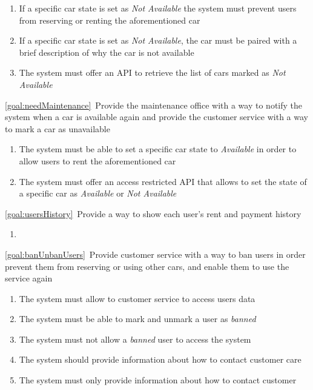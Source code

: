 \begin{description}
\begin{enumerate}[resume*]
   				\item If a specific car state is set as \emph{Not Available} the system must 
   				prevent users from reserving or renting the aforementioned car
   				\item If a specific car state is set as \emph{Not Available}, the car must be paired
   				with a brief description of why the car is not available
   				\item The system must offer an API to retrieve the list of cars marked as \emph{Not
   				Available}
  			\end{enumerate}
		\item \ref{goal:needMaintenance}\ Provide the maintenance office with a way to notify the system when a car is available again and provide the customer service with a way to mark a car as unavailable
			\begin{enumerate}[resume*]
   				\item The system must be able to set a specific car state to \emph{Available} in order 
   				to allow users to rent the aforementioned car
   				\item The system must offer an access restricted API  that allows
   				to set the state of a specific car as \emph{Available} or \emph{Not Available}
  			\end{enumerate}
  		\item \ref{goal:usersHistory}\ Provide a way to show each user's rent and payment history
  			\begin{enumerate}[resume*]
  				\item
  			\end{enumerate}
  		\item \ref{goal:banUnbanUsers}\ Provide customer service with a way to ban users in order
  		prevent them from reserving or using other cars, and enable them to use the service again
  			\begin{enumerate}[resume*]
  				\item The system must allow to customer service to access users data 
  				\item The system must be able to mark and unmark a user as \emph{banned} 
  				\item The system must not allow a \emph{banned} user to access the system
  				\item The system should provide information about how to contact customer care
   				\item The system must only provide information about how to contact customer

\end{enumerate}
\end{description}
